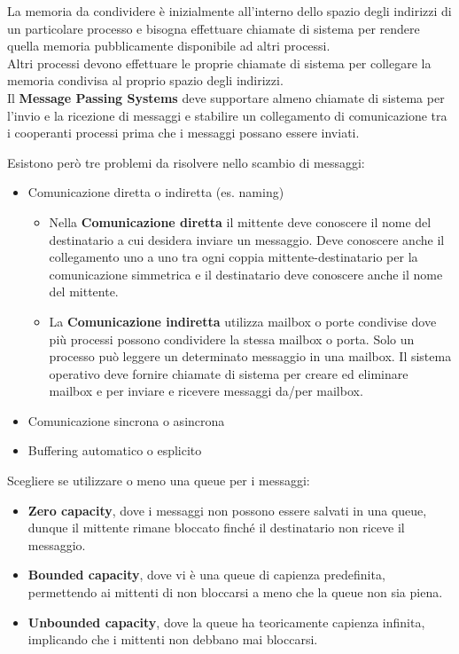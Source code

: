 \documentclass{article}
\begin{document}
La memoria da condividere è inizialmente all'interno dello spazio degli indirizzi di un particolare processo e bisogna effettuare chiamate di sistema per rendere quella memoria pubblicamente disponibile ad altri processi.\\ Altri processi devono effettuare le proprie chiamate di sistema per collegare la memoria condivisa al proprio spazio degli indirizzi. \\
Il \textbf{Message Passing Systems} deve supportare almeno chiamate di sistema per l'invio e la ricezione di messaggi e stabilire un collegamento di comunicazione tra i cooperanti processi prima che i messaggi possano essere inviati.\\
\linebreak

Esistono però tre problemi da risolvere nello scambio di messaggi:\\

\begin{itemize}
    \item Comunicazione diretta o indiretta (es. naming) 
    \begin{itemize}
        \item Nella \textbf{Comunicazione diretta} il mittente deve conoscere il nome del destinatario a cui desidera inviare un messaggio. Deve conoscere anche il collegamento uno a uno tra ogni coppia mittente-destinatario per la comunicazione simmetrica e il destinatario deve conoscere anche il nome del mittente.
        \item La \textbf{Comunicazione indiretta} utilizza mailbox o porte condivise dove più processi possono condividere la stessa mailbox o porta. Solo un processo può leggere un determinato messaggio in una mailbox. Il sistema operativo deve fornire chiamate di sistema per creare ed eliminare mailbox e per inviare e ricevere messaggi da/per mailbox. 
    \end{itemize}
    \item Comunicazione sincrona o asincrona 
    \item Buffering automatico o esplicito
\end{itemize}
Scegliere se utilizzare o meno una queue per i messaggi:

\begin{itemize}
    \item \textbf{Zero capacity}, dove i messaggi non possono essere salvati in una queue, dunque il mittente rimane bloccato finché il destinatario non riceve il messaggio.
    \item \textbf{Bounded capacity}, dove vi è una queue di capienza predefinita, permettendo ai mittenti di non bloccarsi a meno che la queue non sia piena.
    \item \textbf{Unbounded capacity}, dove la queue ha teoricamente capienza infinita, implicando che i mittenti non debbano mai bloccarsi.
\end{itemize}
\end{document}
